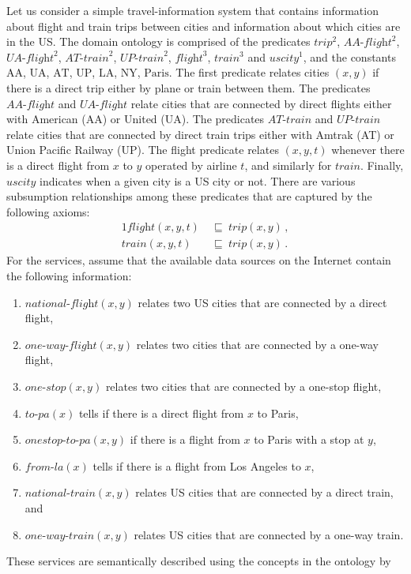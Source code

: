 \documentclass{llncs}
\newcommand{\orule}{\sqsubseteq}
\newcommand{\trip}{\textit{trip}}
\newcommand{\AAflight}{\textit{AA-flight}}
\newcommand{\UAflight}{\textit{UA-flight}}
\newcommand{\ATtrain}{\textit{AT-train}}
\newcommand{\UPtrain}{\textit{UP-train}}
\newcommand{\flight}{\textit{flight}}
\newcommand{\train}{\textit{train}}
\newcommand{\UScity}{\textit{uscity}}
\renewcommand{\AA}{\text{AA}}
\newcommand{\UA}{\text{UA}}
\newcommand{\AT}{\text{AT}}
\newcommand{\UP}{\text{UP}}
\newcommand{\PA}{\text{Paris}}
\newcommand{\NY}{\text{NY}}
\newcommand{\LA}{\text{LA}}
\newcommand{\nationalFlight}{\textit{national-flight}}
\newcommand{\onewayFlight}{\textit{one-way-flight}}
\newcommand{\nationalTrain}{\textit{national-train}}
\newcommand{\onewayTrain}{\textit{one-way-train}}
\newcommand{\onestop}{\textit{one-stop}}
\newcommand{\toPA}{\textit{to-pa}}
\newcommand{\onestopPA}{\textit{onestop-to-pa}}
\newcommand{\fromLA}{\textit{from-la}}
\begin{document}
Let us consider a simple travel-information system that contains
information about flight and train trips between cities and information
about which cities are in the US. The domain ontology is comprised
of the predicates $\trip^2$, $\AAflight^2$, $\UAflight^2$, $\ATtrain^2$,
$\UPtrain^2$, $\flight^3$, $\train^3$ and $\UScity^1$, and the constants
$\AA$, $\UA$, $\AT$, $\UP$, $\LA$, $\NY$, $\PA$.
The first predicate relates cities $(x,y)$ if there is a direct
trip either by plane or train between them.
The predicates $\AAflight$ and $\UAflight$ relate cities that are
connected by direct flights either with American (AA) or United (UA).
The predicates $\ATtrain$ and $\UPtrain$ relate cities that are
connected by direct train trips either with Amtrak (AT) or Union
Pacific Railway (UP). The flight predicate relates $(x,y,t)$ whenever
there is a direct flight from $x$ to $y$ operated by airline $t$,
and similarly for $\train$. Finally, $\UScity$ indicates when a
given city is a US city or not.
There are various subsumption relationships among these predicates
that are captured by the following axioms:
\begin{alignat*}{1}
\flight(x,y,t)\  &\orule\ \trip(x,y)\,, \\
\train(x,y,t)\   &\orule\ \trip(x,y)\,.
\end{alignat*}
For the services, assume that the available data sources on the
Internet contain the following information:
\begin{enumerate}[--]
\item $\nationalFlight(x,y)$ relates two US cities that are connected by a direct flight,
\item $\onewayFlight(x,y)$ relates two cities that are connected by a one-way flight,
\item $\onestop(x,y)$ relates two cities that are connected by a one-stop flight,
\item $\toPA(x)$ tells if there is a direct flight from $x$ to Paris,
\item $\onestopPA(x,y)$ if there is a flight from $x$ to Paris with a stop at $y$, 
\item $\fromLA(x)$ tells if there is a flight from Los Angeles to $x$,
\item $\nationalTrain(x,y)$ relates US cities that are connected by a direct train, and
\item $\onewayTrain(x,y)$ relates US cities that are connected by a one-way train.
\end{enumerate}
These services are semantically described using the concepts in the ontology by
\end{document}
